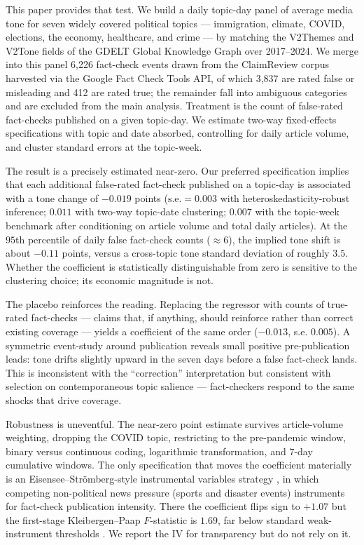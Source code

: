 \documentclass[12pt]{article}
\begin{document}
This paper provides that test. We build a daily topic-day panel of average media tone for seven widely covered political topics --- immigration, climate, COVID, elections, the economy, healthcare, and crime --- by matching the V2Themes and V2Tone fields of the GDELT Global Knowledge Graph \citep{leetaru2013gdelt} over 2017--2024. We merge into this panel 6{,}226 fact-check events drawn from the ClaimReview corpus harvested via the Google Fact Check Tools API, of which 3{,}837 are rated false or misleading and 412 are rated true; the remainder fall into ambiguous categories and are excluded from the main analysis. Treatment is the count of false-rated fact-checks published on a given topic-day. We estimate two-way fixed-effects specifications with topic and date absorbed, controlling for daily article volume, and cluster standard errors at the topic-week.

The result is a precisely estimated near-zero. Our preferred specification implies that each additional false-rated fact-check published on a topic-day is associated with a tone change of $-0.019$ points ($\text{s.e.} = 0.003$ with heteroskedasticity-robust inference; $0.011$ with two-way topic-date clustering; $0.007$ with the topic-week benchmark after conditioning on article volume and total daily articles). At the $95$th percentile of daily false fact-check counts ($\approx 6$), the implied tone shift is about $-0.11$ points, versus a cross-topic tone standard deviation of roughly $3.5$. Whether the coefficient is statistically distinguishable from zero is sensitive to the clustering choice; its economic magnitude is not.

The placebo reinforces the reading. Replacing the regressor with counts of true-rated fact-checks --- claims that, if anything, should reinforce rather than correct existing coverage --- yields a coefficient of the same order ($-0.013$, s.e. $0.005$). A symmetric event-study around publication reveals small positive pre-publication leads: tone drifts slightly upward in the seven days before a false fact-check lands. This is inconsistent with the ``correction'' interpretation but consistent with selection on contemporaneous topic salience --- fact-checkers respond to the same shocks that drive coverage.

Robustness is uneventful. The near-zero point estimate survives article-volume weighting, dropping the COVID topic, restricting to the pre-pandemic window, binary versus continuous coding, logarithmic transformation, and $7$-day cumulative windows. The only specification that moves the coefficient materially is an Eisensee--Str\"omberg-style instrumental variables strategy \citep{eisensee2007}, in which competing non-political news pressure (sports and disaster events) instruments for fact-check publication intensity. There the coefficient flips sign to $+1.07$ but the first-stage Kleibergen--Paap $F$-statistic is $1.69$, far below standard weak-instrument thresholds \citep{stock2005}. We report the IV for transparency but do not rely on it.
\end{document}
